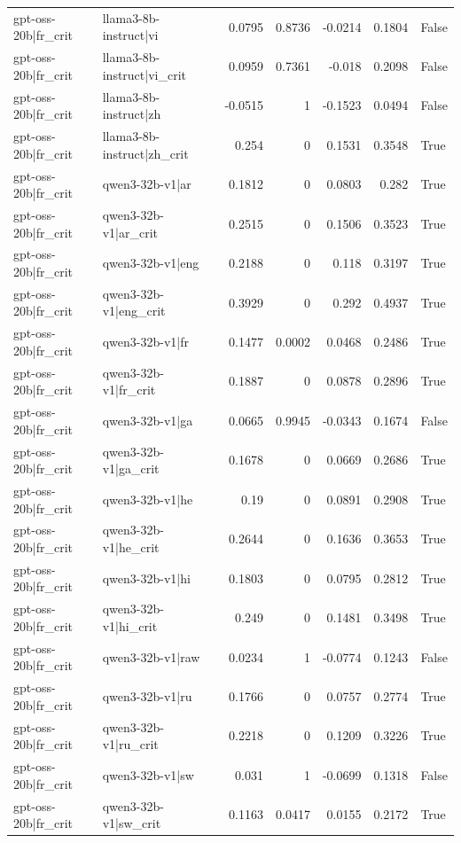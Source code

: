 \begin{table}
\begin{tabular}{l l r r r r l}
gpt-oss-20b|fr_crit & llama3-8b-instruct|vi & 0.0795 & 0.8736 & -0.0214 & 0.1804 & False \\
gpt-oss-20b|fr_crit & llama3-8b-instruct|vi_crit & 0.0959 & 0.7361 & -0.018 & 0.2098 & False \\
gpt-oss-20b|fr_crit & llama3-8b-instruct|zh & -0.0515 & 1 & -0.1523 & 0.0494 & False \\
gpt-oss-20b|fr_crit & llama3-8b-instruct|zh_crit & 0.254 & 0 & 0.1531 & 0.3548 & True \\
gpt-oss-20b|fr_crit & qwen3-32b-v1|ar & 0.1812 & 0 & 0.0803 & 0.282 & True \\
gpt-oss-20b|fr_crit & qwen3-32b-v1|ar_crit & 0.2515 & 0 & 0.1506 & 0.3523 & True \\
gpt-oss-20b|fr_crit & qwen3-32b-v1|eng & 0.2188 & 0 & 0.118 & 0.3197 & True \\
gpt-oss-20b|fr_crit & qwen3-32b-v1|eng_crit & 0.3929 & 0 & 0.292 & 0.4937 & True \\
gpt-oss-20b|fr_crit & qwen3-32b-v1|fr & 0.1477 & 0.0002 & 0.0468 & 0.2486 & True \\
gpt-oss-20b|fr_crit & qwen3-32b-v1|fr_crit & 0.1887 & 0 & 0.0878 & 0.2896 & True \\
gpt-oss-20b|fr_crit & qwen3-32b-v1|ga & 0.0665 & 0.9945 & -0.0343 & 0.1674 & False \\
gpt-oss-20b|fr_crit & qwen3-32b-v1|ga_crit & 0.1678 & 0 & 0.0669 & 0.2686 & True \\
gpt-oss-20b|fr_crit & qwen3-32b-v1|he & 0.19 & 0 & 0.0891 & 0.2908 & True \\
gpt-oss-20b|fr_crit & qwen3-32b-v1|he_crit & 0.2644 & 0 & 0.1636 & 0.3653 & True \\
gpt-oss-20b|fr_crit & qwen3-32b-v1|hi & 0.1803 & 0 & 0.0795 & 0.2812 & True \\
gpt-oss-20b|fr_crit & qwen3-32b-v1|hi_crit & 0.249 & 0 & 0.1481 & 0.3498 & True \\
gpt-oss-20b|fr_crit & qwen3-32b-v1|raw & 0.0234 & 1 & -0.0774 & 0.1243 & False \\
gpt-oss-20b|fr_crit & qwen3-32b-v1|ru & 0.1766 & 0 & 0.0757 & 0.2774 & True \\
gpt-oss-20b|fr_crit & qwen3-32b-v1|ru_crit & 0.2218 & 0 & 0.1209 & 0.3226 & True \\
gpt-oss-20b|fr_crit & qwen3-32b-v1|sw & 0.031 & 1 & -0.0699 & 0.1318 & False \\
gpt-oss-20b|fr_crit & qwen3-32b-v1|sw_crit & 0.1163 & 0.0417 & 0.0155 & 0.2172 & True \\

\end{tabular}
\end{table}
